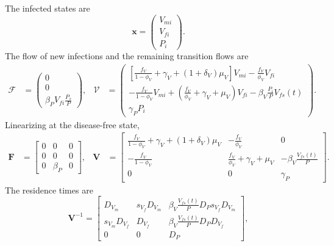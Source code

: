 \documentclass{article}
\newcommand{\mat}[1]{\mathbf{#1}}
\renewcommand{\vec}[1]{\mathbf{#1}}
\begin{document}
The infected states are
\begin{equation}
  \label{eq:9}
  \vec{x} =
  \begin{pmatrix}
    V_{mi}
    \\
    V_{fi}
    \\
    P_i
  \end{pmatrix}.
\end{equation}
The flow of new infections and the remaining transition flows are
\begin{align}
  \mathcal{F}
  &=
  \begin{pmatrix}
    0
    \\
    0
    \\
    \beta_P V_{fi} \frac{P_s}{P}
  \end{pmatrix},
  &
  \mathcal{V}
  &=
  \begin{pmatrix}
    \left[
      \frac{f_V}{1 - \phi_V}
      + \gamma_V
      + (1 + \delta_V) \mu_V
    \right] V_{mi}
    - \frac{f_V}{\phi_V} V_{fi}
    \\
    - \frac{f_V}{1 - \phi_V} V_{mi}
    + \left(\frac{f_V}{\phi_V} + \gamma_V + \mu_V\right) V_{fi}
    - \beta_V \frac{P_i}{P} V_{fs}(t)
    \\
    \gamma_P P_i
  \end{pmatrix}.
\end{align}
Linearizing at the disease-free state,
\begin{align}
  \mat{F} &=
  \begin{bmatrix}
    0
    &
    0
    &
    0
    \\
    0
    &
    0
    &
    0
    \\
    0
    &
    \beta_P
    &
    0
  \end{bmatrix},
  &
  \mat{V} &=
  \begin{bmatrix}
    \frac{f_V}{1 - \phi_V} + \gamma_V + (1 + \delta_V) \mu_V
    &
    - \frac{f_V}{\phi_V} 
    &
    0
    \\
    - \frac{f_V}{1 - \phi_V}
    &
    \frac{f_V}{\phi_V} + \gamma_V + \mu_V
    &
    - \beta_V \frac{V_{fs}(t)}{P}
    \\
    0
    &
    0
    &
    \gamma_P
  \end{bmatrix}.
\end{align}
The residence times are
\begin{equation}
  \mat{V}^{-1} =
  \begin{bmatrix}
    D_{V_m} & s_{V_f} D_{V_m}
    & \beta_V \frac{V_{fs}(t)}{P} D_P s_{V_f} D_{V_m}
    \\
    s_{V_m} D_{V_f} & D_{V_f}
    & \beta_V \frac{V_{fs}(t)}{P} D_P D_{V_f}
    \\
    0 & 0 & D_P
  \end{bmatrix},
\end{equation}
\end{document}
